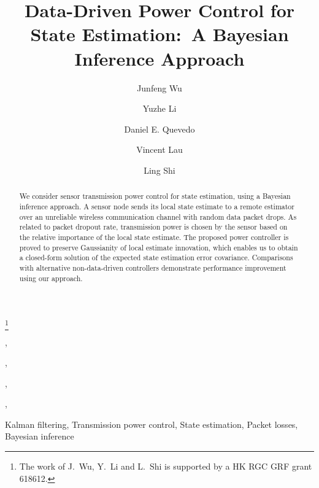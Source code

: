 \documentclass[twocolumn]{autart}    \usepackage{cite}
\begin{document}
\begin{frontmatter}

\title{{Data-Driven Power Control for State Estimation:~A
Bayesian Inference Approach}}

\thanks[footnoteinfo]{The work of J.~Wu, Y.~Li and L.~Shi is
supported by a HK RGC GRF grant 618612. }

\author[Paestum]{Junfeng Wu},
\author[Paestum]{Yuzhe Li},
\author[Rome]{Daniel E. Quevedo},
\author[Paestum]{Vincent Lau},
\author[Paestum]{Ling Shi}

\address[Paestum]{Department of Electronic and Computer Engineering, Hong Kong University of Science and Technology, Hong Kong.}
\address[Rome]{School of Electronic Engineering and Computer Science, University of Newcastle, Australia.}

\begin{keyword}
Kalman filtering, Transmission power control, State estimation, Packet losses, Bayesian
inference
\end{keyword}


\begin{abstract}
We consider sensor transmission power control for state
estimation, using a Bayesian inference approach.
A sensor node sends its local state estimate to a remote estimator over an
unreliable wireless communication channel with random data packet drops. As related to packet dropout rate, transmission power is chosen by the
sensor based on the relative importance of the local state estimate. The
proposed power controller is proved to preserve Gaussianity of
local estimate innovation, which enables us to obtain a closed-form
solution of the expected state estimation error covariance. Comparisons with
alternative non-data-driven controllers demonstrate performance
improvement using our approach.

\end{abstract}

\end{frontmatter}
\end{document}
